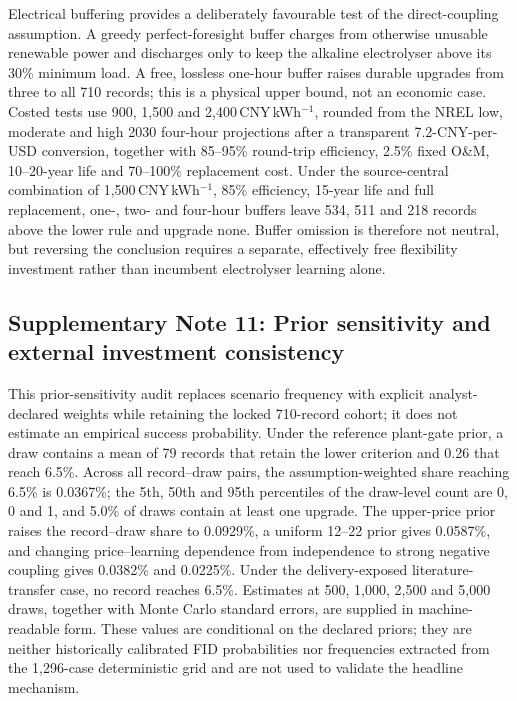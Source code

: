 \documentclass[11pt,a4paper]{article}
\begin{document}
Electrical buffering provides a deliberately favourable test of the direct-coupling assumption. A greedy perfect-foresight buffer charges from otherwise unusable renewable power and discharges only to keep the alkaline electrolyser above its 30\% minimum load. A free, lossless one-hour buffer raises durable upgrades from three to all 710 records; this is a physical upper bound, not an economic case. Costed tests use 900, 1,500 and 2,400\,CNY\,kWh$^{-1}$, rounded from the NREL low, moderate and high 2030 four-hour projections after a transparent 7.2-CNY-per-USD conversion, together with 85--95\% round-trip efficiency, 2.5\% fixed O\&M, 10--20-year life and 70--100\% replacement cost\cite{cole2023battery,nrelatb2023}. Under the source-central combination of 1,500\,CNY\,kWh$^{-1}$, 85\% efficiency, 15-year life and full replacement, one-, two- and four-hour buffers leave 534, 511 and 218 records above the lower rule and upgrade none. Buffer omission is therefore not neutral, but reversing the conclusion requires a separate, effectively free flexibility investment rather than incumbent electrolyser learning alone.

\subsection*{Supplementary Note 11: Prior sensitivity and external investment consistency}

This prior-sensitivity audit replaces scenario frequency with explicit analyst-declared weights while retaining the locked 710-record cohort; it does not estimate an empirical success probability. Under the reference plant-gate prior, a draw contains a mean of 79 records that retain the lower criterion and 0.26 that reach 6.5\%. Across all record--draw pairs, the assumption-weighted share reaching 6.5\% is 0.0367\%; the 5th, 50th and 95th percentiles of the draw-level count are 0, 0 and 1, and 5.0\% of draws contain at least one upgrade. The upper-price prior raises the record--draw share to 0.0929\%, a uniform 12--22 prior gives 0.0587\%, and changing price--learning dependence from independence to strong negative coupling gives 0.0382\% and 0.0225\%. Under the delivery-exposed literature-transfer case, no record reaches 6.5\%. Estimates at 500, 1,000, 2,500 and 5,000 draws, together with Monte Carlo standard errors, are supplied in machine-readable form. These values are conditional on the declared priors; they are neither historically calibrated FID probabilities nor frequencies extracted from the 1,296-case deterministic grid and are not used to validate the headline mechanism.
\end{document}
